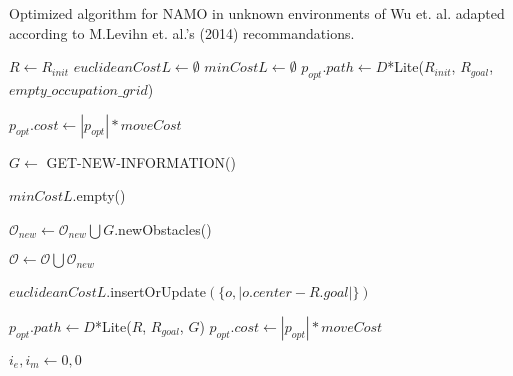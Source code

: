 \begin{algorithm}[H]

  \caption{Optimized algorithm for NAMO in unknown environments of Wu et. al. adapted according to M.Levihn et. al.'s (2014) recommandations.}

  \label{alg:namoue_augmented_uncommented}

  \begin{algorithmic}[1]


        \State $R \gets R_{init}$
        \State $euclideanCostL \gets \emptyset$
        \State $minCostL \gets \emptyset$
        \State $p_{opt}.path \gets D$*Lite($R_{init}$, $R_{goal}$, $empty\_occupation\_grid$)

        \State $p_{opt}.cost \gets |p_{opt}| * moveCost$


        \State $G \gets $ GET-NEW-INFORMATION()

          \State $minCostL$.empty()
        \EndIf

        \State $\mathcal{O}_{new} \gets \mathcal{O}_{new} \bigcup G.$newObstacles()


            \State $\mathcal{O} \gets \mathcal{O} \bigcup \mathcal{O}_{new}$

              \State $euclideanCostL$.insertOrUpdate$(\{o, |o.center - R.goal|\})$
            \EndFor

            \State $p_{opt}.path \gets D$*Lite($R$, $R_{goal}$, $G$)
            \State $p_{opt}.cost \gets |p_{opt}| * moveCost$

            \State $i_{e}, i_{m} \gets 0 , 0$


\end{algorithmic}
\end{algorithm}
